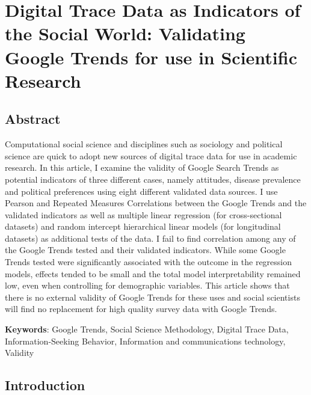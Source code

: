 \hypertarget{paper-1}{%
\chapter{Digital Trace Data as Indicators of the Social World: Validating Google Trends for use in Scientific Research}\label{paper-1}}


\section{Abstract}

Computational social science and disciplines such as sociology and
political science are quick to 
adopt new sources of digital trace data for use in academic research. 
In this article, I examine the validity of Google Search Trends 
as potential indicators of three different cases, namely attitudes, 
disease prevalence and political preferences using eight %
different validated data sources. I use Pearson and Repeated Measures Correlations 
between the Google Trends and the validated indicators as well as multiple linear regression
(for cross-sectional datasets) and random intercept hierarchical linear models
(for longitudinal datasets) as additional tests of the data. 
I fail to find correlation among any of the Google 
Trends tested and their validated indicators. While some Google Trends 
tested were significantly associated with the outcome in the regression models,
effects tended to be small and the total model interpretability remained low,
even when controlling for demographic variables. This article shows that there is no 
external validity of Google Trends for these uses and social scientists
will find no replacement for high quality survey data with Google Trends. 

\textbf{Keywords}: Google Trends, Social Science Methodology, Digital Trace Data, Information-Seeking Behavior, Information and communications technology, Validity

\section{Introduction}


